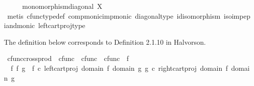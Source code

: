 \begin{isabellebody}
\ \ \isamarkupfalse%
\ \isamarkupfalse%
\ {\isachardoublequoteopen}monomorphism{\isacharparenleft}{\kern0pt}diagonal\ X{\isacharparenright}{\kern0pt}{\isachardoublequoteclose}\isanewline
\ \ \ \ \isamarkupfalse%
\ {\isacharparenleft}{\kern0pt}metis\ cfunc{\isacharunderscore}{\kern0pt}type{\isacharunderscore}{\kern0pt}def\ comp{\isacharunderscore}{\kern0pt}monic{\isacharunderscore}{\kern0pt}imp{\isacharunderscore}{\kern0pt}monic\ diagonal{\isacharunderscore}{\kern0pt}type\ id{\isacharunderscore}{\kern0pt}isomorphism\ iso{\isacharunderscore}{\kern0pt}imp{\isacharunderscore}{\kern0pt}epi{\isacharunderscore}{\kern0pt}and{\isacharunderscore}{\kern0pt}monic\ left{\isacharunderscore}{\kern0pt}cart{\isacharunderscore}{\kern0pt}proj{\isacharunderscore}{\kern0pt}type{\isacharparenright}{\kern0pt}\isanewline
{}\isamarkupfalse%
%
\endisatagproof
{\isafoldproof}%
%
\isadelimproof
%
\endisadelimproof
%
\isadelimdocument
%
\endisadelimdocument
%
\isatagdocument
%
\isamarkuptrue%
%
\endisatagdocument
{\isafolddocument}%
%
\isadelimdocument
%
\endisadelimdocument
%
\begin{isamarkuptext}%
The definition below corresponds to Definition 2.1.10 in Halvorson.%
\end{isamarkuptext}\isamarkuptrue%
\isamarkupfalse%
\ cfunc{\isacharunderscore}{\kern0pt}cross{\isacharunderscore}{\kern0pt}prod\ {\isacharcolon}{\kern0pt}{\isacharcolon}{\kern0pt}\ {\isachardoublequoteopen}cfunc\ {\isasymRightarrow}\ cfunc\ {\isasymRightarrow}\ cfunc{\isachardoublequoteclose}\ {\isacharparenleft}{\kern0pt}\ {\isachardoublequoteopen}{\isasymtimes}\isactrlsub f{\isachardoublequoteclose}\ {}{}{\isacharparenright}{\kern0pt}\ \isanewline
\ \ {\isachardoublequoteopen}f\ {\isasymtimes}\isactrlsub f\ g\ {\isacharequal}{\kern0pt}\ {\isasymlangle}f\ {\isasymcirc}\isactrlsub c\ left{\isacharunderscore}{\kern0pt}cart{\isacharunderscore}{\kern0pt}proj\ {\isacharparenleft}{\kern0pt}domain\ f{\isacharparenright}{\kern0pt}\ {\isacharparenleft}{\kern0pt}domain\ g{\isacharparenright}{\kern0pt}{\isacharcomma}{\kern0pt}\ g\ {\isasymcirc}\isactrlsub c\ right{\isacharunderscore}{\kern0pt}cart{\isacharunderscore}{\kern0pt}proj\ {\isacharparenleft}{\kern0pt}domain\ f{\isacharparenright}{\kern0pt}\ {\isacharparenleft}{\kern0pt}domain\ g{\isacharparenright}{\kern0pt}{\isasymrangle}{\isachardoublequoteclose}\isanewline
\isanewline
{}\isamarkupfalse%

\end{isabellebody}
